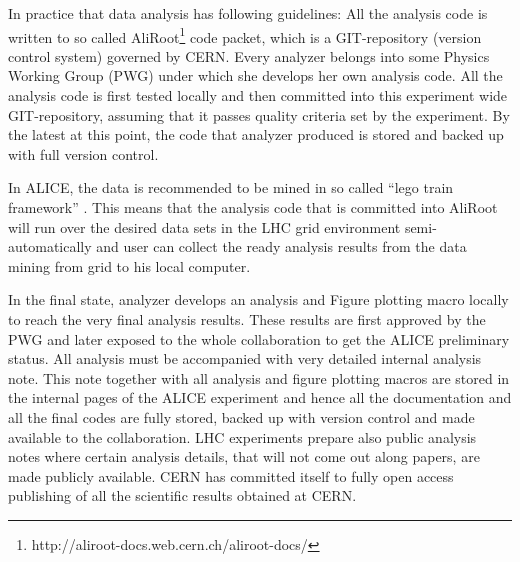 In practice that data analysis has following guidelines: All the analysis code is written to so called AliRoot\footnote{http://aliroot-docs.web.cern.ch/aliroot-docs/} code packet, which is a GIT-repository (version control system) governed by CERN. Every analyzer belongs into some Physics Working Group (PWG) under which she develops her own analysis code. All the analysis code is first tested locally and then committed into this experiment wide GIT-repository, assuming that it passes quality criteria set by the experiment. By the latest at this point, the code that analyzer produced is stored and backed up with full version control. 

In ALICE, the data is recommended to be mined in so called ``lego train framework'' \cite{Zimmermann:2015owa}. This means that the analysis code that is committed into AliRoot will run over the desired data sets in the LHC grid environment semi-automatically and user can collect the ready analysis results from the data mining from grid to his local computer.

In the final state, analyzer develops an analysis and Figure plotting macro locally to reach the very final analysis results. These results are first approved by the PWG and later exposed to the whole collaboration to get the ALICE preliminary status. All analysis must be accompanied with very detailed internal analysis note. This note together with all analysis and figure plotting macros are stored in the internal pages of the ALICE experiment and hence all the documentation and all the final codes are fully stored, backed up with version control and made available to the collaboration. LHC experiments prepare also public analysis notes where certain analysis details, that will not come out along papers, are made publicly available. CERN has committed itself to fully open access publishing of all the scientific results obtained at CERN.

\nopagebreak
